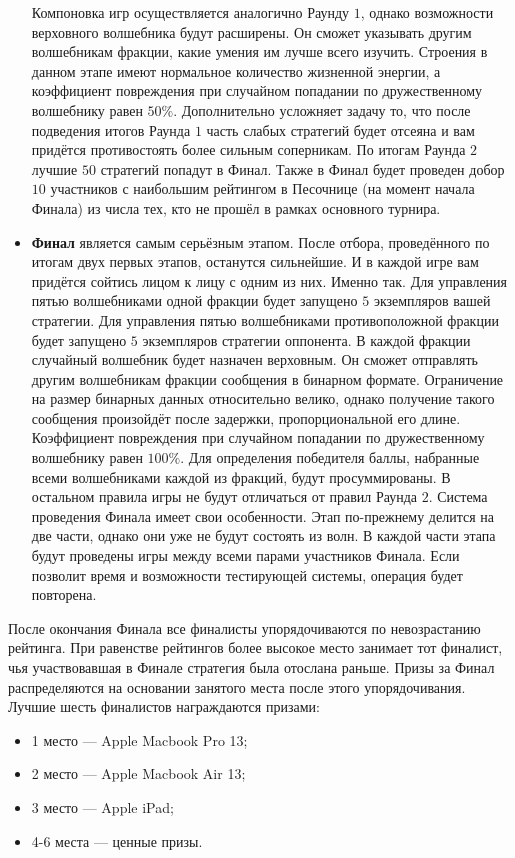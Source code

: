 \begin{itemize}
        Компоновка игр осуществляется аналогично Раунду $1$, однако возможности верховного волшебника будут расширены. Он сможет указывать
        другим волшебникам фракции, какие умения им лучше всего изучить. Строения в данном этапе имеют нормальное количество жизненной
        энергии, а коэффициент повреждения при случайном попадании по дружественному волшебнику равен $50\%$. Дополнительно усложняет задачу
        то, что после подведения итогов Раунда $1$ часть слабых стратегий будет отсеяна и вам придётся противостоять более сильным
        соперникам. По итогам Раунда $2$ лучшие $50$ стратегий попадут в Финал. Также в Финал будет проведен добор $10$ участников с
        наибольшим рейтингом в Песочнице (на момент начала Финала) из числа тех, кто не прошёл в рамках основного турнира.
  \item \textbf{Финал} является самым серьёзным этапом. После отбора, проведённого по итогам двух первых этапов, останутся сильнейшие. И в
        каждой игре вам придётся сойтись лицом к лицу с одним из них. Именно так. Для управления пятью волшебниками одной фракции будет
        запущено $5$ экземпляров вашей стратегии. Для управления пятью волшебниками противоположной фракции будет запущено $5$ экземпляров
        стратегии оппонента. В каждой фракции случайный волшебник будет назначен верховным. Он сможет отправлять другим волшебникам фракции
        сообщения в бинарном формате. Ограничение на размер бинарных данных относительно велико, однако получение такого сообщения
        произойдёт после задержки, пропорциональной его длине. Коэффициент повреждения при случайном попадании по дружественному волшебнику
        равен $100\%$. Для определения победителя баллы, набранные всеми волшебниками каждой из фракций, будут просуммированы. В остальном
        правила игры не будут отличаться от правил Раунда $2$. Система проведения Финала имеет свои особенности. Этап по-прежнему делится на
        две части, однако они уже не будут состоять из волн. В каждой части этапа будут проведены игры между всеми парами участников Финала.
        Если позволит время и возможности тестирующей системы, операция будет повторена.
\end{itemize}

После окончания Финала все финалисты упорядочиваются по невозрастанию рейтинга. При равенстве рейтингов более высокое место занимает тот
финалист, чья участвовавшая в Финале стратегия была отослана раньше. Призы за Финал распределяются на основании занятого места после этого
упорядочивания. Лучшие шесть финалистов награждаются призами:
\begin{itemize}
\item 1 место --- Apple Macbook Pro 13\textquotedbl;
\item 2 место --- Apple Macbook Air 13\textquotedbl;
\item 3 место --- Apple iPad;
\item 4-6 места --- ценные призы.
\end{itemize}

